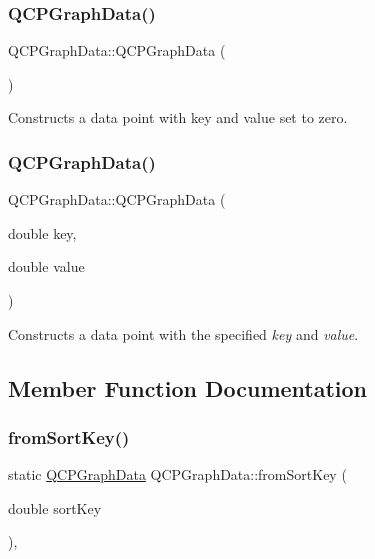 \subsubsection{\texorpdfstring{QCPGraphData()}{QCPGraphData()}\hspace{0.1cm}{\footnotesize\ttfamily [1/2]}}
{\footnotesize\ttfamily Q\+C\+P\+Graph\+Data\+::\+Q\+C\+P\+Graph\+Data (\begin{DoxyParamCaption}{ }\end{DoxyParamCaption})}

Constructs a data point with key and value set to zero. \mbox{\label{class_q_c_p_graph_data_a2c32177f12f902f4e05f712837082bd6}} 
\subsubsection{\texorpdfstring{QCPGraphData()}{QCPGraphData()}\hspace{0.1cm}{\footnotesize\ttfamily [2/2]}}
{\footnotesize\ttfamily Q\+C\+P\+Graph\+Data\+::\+Q\+C\+P\+Graph\+Data (\begin{DoxyParamCaption}\item[{double}]{key,  }\item[{double}]{value }\end{DoxyParamCaption})}

Constructs a data point with the specified {\itshape key} and {\itshape value}. 

\subsection{Member Function Documentation}
\mbox{\label{class_q_c_p_graph_data_a4646eac7f7a48970ea0fc5153aab0e77}} 
\subsubsection{\texorpdfstring{fromSortKey()}{fromSortKey()}}
{\footnotesize\ttfamily static \mbox{\hyperlink{class_q_c_p_graph_data}{Q\+C\+P\+Graph\+Data}} Q\+C\+P\+Graph\+Data\+::from\+Sort\+Key (\begin{DoxyParamCaption}\item[{double}]{sort\+Key }\end{DoxyParamCaption})\hspace{0.3cm}{\ttfamily [inline]}, {\ttfamily [static]}}


